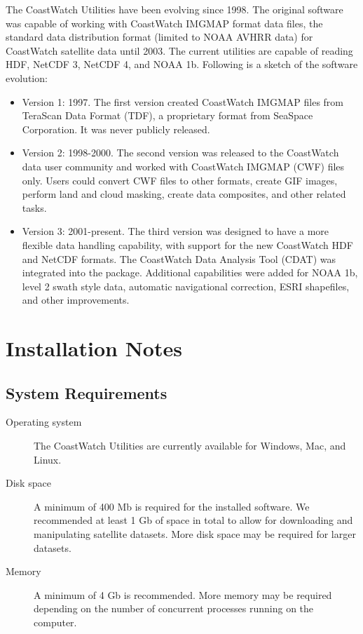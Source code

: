 The CoastWatch Utilities have been evolving since 1998.  The original
software was capable of working with CoastWatch IMGMAP format data
files, the standard data distribution format (limited to NOAA AVHRR
data) for CoastWatch satellite data until 2003.  The current utilities
are capable of reading HDF, NetCDF 3, NetCDF 4, and NOAA 1b.  Following
is a sketch of the software evolution:
\begin{itemize}

  \item Version 1: 1997.  The first version created CoastWatch IMGMAP
  files from TeraScan Data Format (TDF), a proprietary format from
  SeaSpace Corporation.  It was never publicly released.

  \item Version 2: 1998-2000.  The second version was released to the
  CoastWatch data user community and worked with CoastWatch IMGMAP
  (CWF) files only.  Users could convert CWF files to other formats,
  create GIF images, perform land and cloud masking, create data
  composites, and other related tasks.  

  \item Version 3: 2001-present.  The third version was designed to have
  a more flexible data handling capability, with support for the new
  CoastWatch HDF and NetCDF formats.  The CoastWatch
  Data Analysis Tool (CDAT) was integrated into the package.
  Additional capabilities were added for NOAA 1b, level 2 swath
  style data, automatic navigational correction, ESRI shapefiles, and
  other improvements.

\end{itemize}

\section{Installation Notes}

\subsection{System Requirements}

\begin{description}

  \item[Operating system] The CoastWatch Utilities are currently
  available for Windows, Mac, and Linux.

  \item[Disk space] A minimum of 400 Mb is required for the installed
  software. We recommended at least 1 Gb of space in total to
  allow for downloading and manipulating satellite datasets. More
  disk space may be required for larger datasets.

  \item[Memory] A minimum of 4 Gb is recommended.  More memory
  may be required depending on the number of concurrent processes
  running on the computer.

\end{description}

